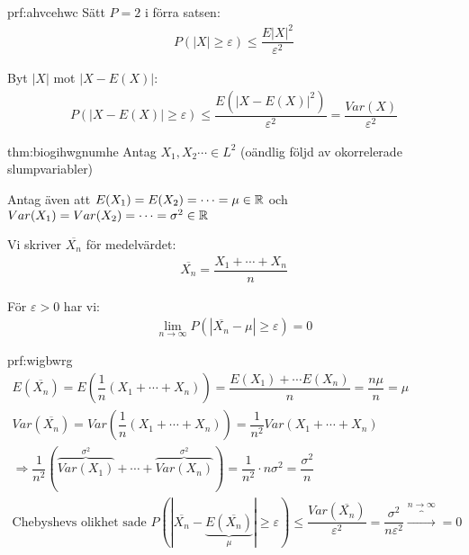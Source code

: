 \begin{prf}{prf:ahvcehwc}
  Sätt $P=2$ i förra satsen:
  \begin{equation*}
    \begin{gathered}
      P(\left|X\right|\geq\varepsilon)\leq\dfrac{E\left|X\right|^2}{\varepsilon^2}
    \end{gathered}
  \end{equation*}\par
  \noindent Byt $\left|X\right|$ mot $\left|X-E(X)\right|$:
  \begin{equation*}
    \begin{gathered}
      P(\left|X-E(X)\right|\geq\varepsilon)\leq\dfrac{E(\left|X-E(X)\right|^2)}{\varepsilon^2} = \dfrac{Var(X)}{\varepsilon^2}
    \end{gathered}
  \end{equation*}
\end{prf}
\par\bigskip
\begin{theo}{thm:biogihwgnumhe}
  Antag $X_1,X_2\cdots\in L^2$ (oändlig följd av okorrelerade slumpvariabler)\par
  \noindent Antag även att $E(X_1) = E(X_2)=\cdots = \mu\in\mathbb{R}$ och $Var(X_1)=Var(X_2)=\cdots=\sigma^2\in\mathbb{R}$\par
  \noindent Vi skriver $\overline{X_n}$ för medelvärdet:
  \begin{equation*}
    \begin{gathered}
      \overline{X_n} = \dfrac{X_1+\cdots+X_n}{n}
    \end{gathered}
  \end{equation*}\par
  \noindent För $\varepsilon >0$ har vi:
  \begin{equation*}
    \begin{gathered}
      \lim_{n\to\infty}P\left(\left|\overline{X_n}-\mu\right|\geq\varepsilon\right) = 0
    \end{gathered}
  \end{equation*}
\end{theo}
\newpage
\begin{prf}{prf:wigbwrg}
  \begin{equation*}
    \begin{gathered}
      E(\overline{X_n}) = E\left(\dfrac{1}{n}(X_1+\cdots+X_n)\right) = \dfrac{E(X_1)+\cdots E(X_n)}{n} = \dfrac{n\mu}{n} = \mu\\
      Var(\overline{X_n}) = Var\left(\dfrac{1}{n}(X_1+\cdots+X_n)\right) = \dfrac{1}{n^2}Var(X_1+\cdots+X_n)\\
      \Rightarrow \dfrac{1}{n^2}(\overbrace{Var(X_1)}^{\text{$\sigma^2$}}+\cdots+\overbrace{Var(X_n)}^{\text{$\sigma^2$}}) = \dfrac{1}{n^2}\cdot n\sigma^2 = \dfrac{\sigma^2}{n}\\
      \text{Chebyshevs olikhet sade } P\left(\left|\overline{X_n}-\underbrace{E(\overline{X_n})}_{\text{$\mu$}}\right|\geq\varepsilon\right)\leq \dfrac{Var(\overline{X_n})}{\varepsilon^2} = \dfrac{\sigma^2}{n\varepsilon^2}\overbrace{\to}^{\text{$n\to\infty$}}=0
    \end{gathered}
  \end{equation*}
\end{prf}
